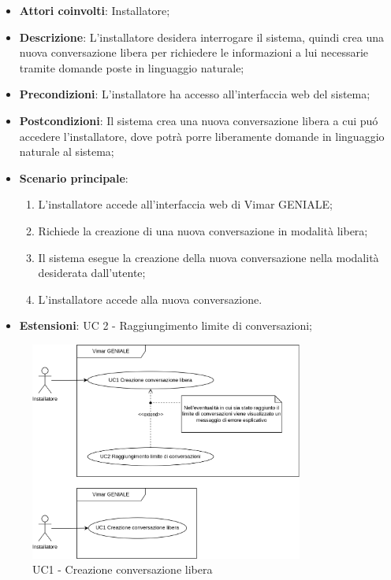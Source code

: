 
\begin{itemize}
    \item \textbf{Attori coinvolti}: Installatore;
    \item \textbf{Descrizione}: L’installatore desidera interrogare il sistema, quindi crea una nuova conversazione libera per richiedere le informazioni a lui necessarie tramite domande poste in linguaggio naturale;
    \item \textbf{Precondizioni}: L’installatore ha accesso all’interfaccia web del sistema;
    \item \textbf{Postcondizioni}: Il sistema crea una nuova conversazione libera a cui puó accedere l’installatore, dove potrà porre liberamente domande in linguaggio naturale al sistema;
    \item \textbf{Scenario principale}:
    \begin{enumerate}
    \item L’installatore accede all’interfaccia web di Vimar GENIALE;
    \item Richiede la creazione di una nuova conversazione in modalità libera;
    \item Il sistema esegue la creazione della nuova conversazione nella modalità desiderata dall’utente;
    \item  L’installatore accede alla nuova conversazione.
    \end{enumerate}
    \item \textbf{Estensioni}: UC 2 - Raggiungimento limite di conversazioni;
\end{itemize}
\begin{figure}[H]
\centering
\includegraphics[width=0.8\textwidth]{contents/casi_duso/png/UC1.png}
\caption{UC1 - Creazione conversazione libera}
\end{figure}

